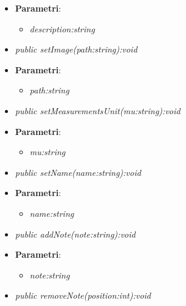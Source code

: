 \begin{itemize}
\begin{itemize}
				\item{\textbf{Parametri}: \begin{itemize}
				\item \textit{description:string}\\

			\end{itemize}}
	\item \textit{public setImage(path:string):void}\\
	
				\item{\textbf{Parametri}: \begin{itemize}
				\item \textit{path:string}\\

			\end{itemize}}
	\item \textit{public setMeasurementsUnit(mu:string):void}\\
	
				\item{\textbf{Parametri}: \begin{itemize}
				\item \textit{mu:string}\\

			\end{itemize}}
	\item \textit{public setName(name:string):void}\\
	
				\item{\textbf{Parametri}: \begin{itemize}
				\item \textit{name:string}\\

			\end{itemize}}

	\item \textit{public addNote(note:string):void}\\
	
				\item{\textbf{Parametri}: \begin{itemize}
				\item \textit{note:string}\\

			\end{itemize}}
	\item \textit{public removeNote(position:int):void}\\
	

\end{itemize}
\end{itemize}
